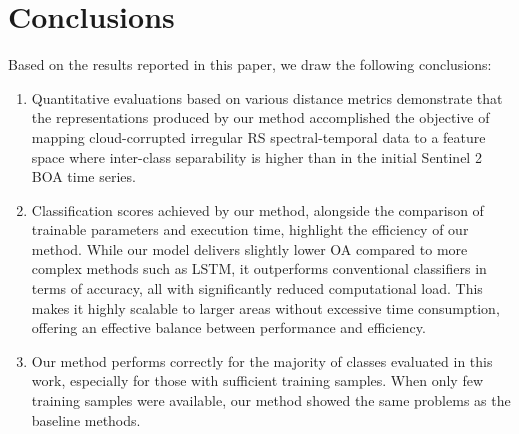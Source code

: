 \documentclass[journal,article,submit,pdftex,moreauthors]{Definitions/mdpi}
\begin{document}
\section{Conclusions}
Based on the results reported in this paper, we draw the following conclusions:
\begin{enumerate}
	\item Quantitative evaluations based on various distance metrics  demonstrate that the representations produced by our method accomplished the objective of mapping cloud-corrupted irregular RS spectral-temporal data to a feature space where inter-class separability is higher than in the initial Sentinel 2 BOA time series.
    \item Classification scores achieved by our method, alongside the comparison of trainable parameters and execution time, highlight the efficiency of our method. While our model delivers slightly lower OA compared to more complex methods such as LSTM, it outperforms conventional classifiers in terms of accuracy, all with significantly reduced computational load. This makes it highly scalable to larger areas without excessive time consumption, offering an effective balance between performance and efficiency.
    \item Our method performs correctly for the majority of classes evaluated in this work, especially for those with sufficient training samples. When only few training samples were available, our method showed the same problems as the baseline methods.
\end{enumerate}
\end{document}

